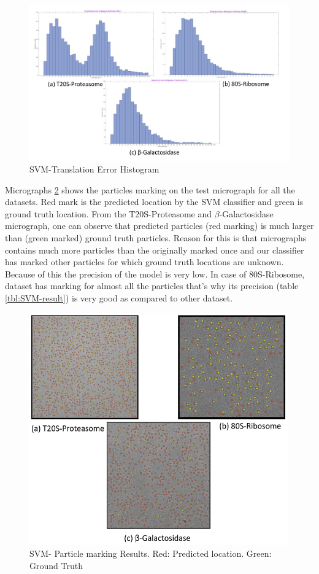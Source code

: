 \documentclass[twoside]{iitbreport}
\begin{document}
\begin{figure}[H]
\includegraphics[width=1\linewidth]{svm-all-Translation_Error_Histogram.png}
\centering
\captionsetup{justification=centering}
\caption{SVM-Translation Error Histogram}
\label{fig: SVM-Translation_Error_Histogram}
\end{figure}

Micrographs \ref{fig: SVM-micrograph-marking} shows the particles marking on the test micrograph for all the datasets. Red mark is the predicted location by the SVM classifier and green is ground truth location. From the T20S-Proteasome and $\beta$-Galactosidase micrograph, one can observe that predicted particles (red marking) is much larger than (green marked) ground truth particles. Reason for this is that micrographs contains much more particles than the originally marked once and  our classifier has marked other particles for which ground truth locations are unknown. Because of this the precision of the model is very low. In case of 80S-Ribosome, dataset has marking for almost all the particles that's why its precision (table \ref{tbl:SVM-result}) is very good as compared to other dataset.

\begin{figure}[H]
\includegraphics[width=0.98\linewidth,height=10cm]{svm-all-result.png}
\centering
\captionsetup{justification=centering}
\caption{SVM- Particle marking Results. Red: Predicted location. Green: Ground Truth}
\label{fig: SVM-micrograph-marking}
\end{figure}
\end{document}
